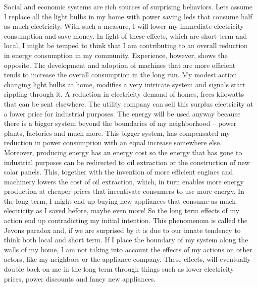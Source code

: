 Social and economic systems are  rich sources of surprising behaviors. Lets assume I replace all the light bulbs in my home with power saving leds that consume half as much electricity. With such a measure, I will  lower my immediate electricity consumption and save money. In light of these effects, which are short-term and local, I might be temped to think that I am contributing to an overall reduction in energy consumption in my community. Experience, however, shows the opposite. The development and adoption of machines that are more efficient tends to increase the overall consumption in the long run. My modest action changing light bulbs at home, modifies a very intricate system and signals start rippling through it. A reduction in electricity demand of homes, frees kilowatts that can be sent elsewhere. The utility company can sell this surplus electricity at a lower price for industrial purposes. The energy will be used anyway because there is a bigger system beyond the boundaries of my neighborhood -- power plants, factories and much more. This bigger system, has compensated my reduction in power consumption with an equal increase somewhere else. Moreover, producing energy has an energy cost so the energy that has gone to industrial purposes can be redirected to oil extraction or the construction of new solar panels. This, together with the invention of more efficient engines and machinery lowers the cost of oil extraction, which, in turn enables more energy production at cheaper prices that incentivate consumers to use more energy. In the long term, I might end up  buying new appliances that consume as much electricity as I saved before, maybe even more! So the long term effects of my action end up contradicting my initial intention. This phenomenom is called the Jevons paradox and, if we are surprised by it is due to our innate tendency to think both local and short term. If I place the boundary of my system along the walls of my home, I am not taking into account the effects of my actions on other actors, like my neighbors or the appliance company. These effects, will eventually double back on me in the long term through things such as lower electricity prices, power discounts and fancy new appliances.


